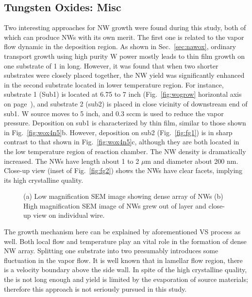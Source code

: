 \subsection{Tungsten Oxides: Misc}

Two interesting approaches for  NW growth were found during this study, both of which can produce  NWs with its own merit. The first one is related to the vapor flow dynamic in the deposition region. As shown in Sec.~\ref{sec:nawox}, ordinary transport growth using high purity W power mostly leads to thin film growth on one substrate of 1 in long. However, it was found that when two shorter substrates were closely placed together, the  NW yield was significantly enhanced in the second substrate located in lower temperature region. For instance, substrate 1 (Sub1) is located at 6.75 to 7 inch (Fig.~\ref{fig:wogrow} horizontal axis on page~\pageref{fig:wogrow}), and substrate 2 (sub2) is placed in close vicinity of downstream end of sub1. W source moves to 5 inch, and 0.3 sccm  is used to reduce the  vapor pressure. Deposition on sub1 is characterized by thin film, similar to those shown in Fig.~\ref{fig:wox4n5}b. However, deposition on sub2 (Fig.~\ref{fig:fg1}) is in sharp contrast to that shown in Fig.~\ref{fig:wox4n5}c, although they are both located in the low temperature region of reaction chamber. The NW density is dramatically increased. The NWs have length about 1 to 2 $\mu$m and diameter about 200 nm. Close-up view (inset of Fig.~\ref{fig:fg2}) shows the NWs have clear facets, implying its high crystalline quality.
\begin{figure}[htb]
\centering
{}\hspace{0.04\textwidth}
\caption[Characterization of flow growth : SEM]{ (a) Low magnification SEM image showing dense array of NWs (b) High magnification SEM image of NWs grew out of layer and close-up view on individual wire.}
\label{fig:wogrowsf}
\end{figure}
The growth mechanism here can be explained by aforementioned VS process as well. Both local flow and temperature play an vital role in the formation of dense NW array. Splitting one substrate into two presumably introduces some fluctuation in the vapor flow. It is well known that in lamellar flow region, there is a velocity boundary above the side wall. In spite of the high crystalline quality, the  is not long enough and yield is limited by the evaporation of source materials; therefore this approach is not seriously pursued in this study. 

